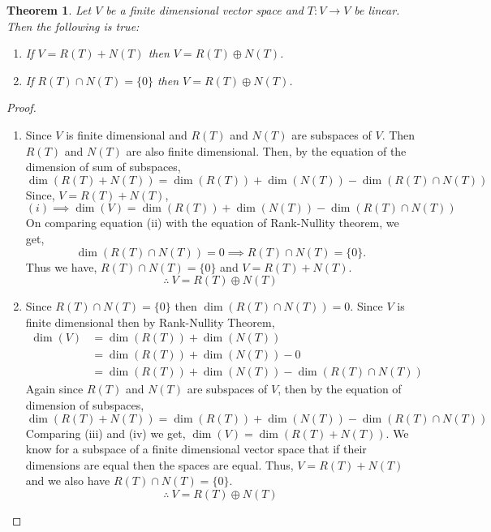 \documentclass[12pt, a4paper]{article}
\newtheorem{theorem}{Theorem}[section]
\theoremstyle{definition}
\theoremstyle{remark}
\begin{document}
\begin{theorem}
    Let $V$ be a finite dimensional vector space and $T:V \to V$ be linear. Then the following is true:
    \begin{enumerate}
        \item If $V = R(T) + N(T)$ then $V = R(T)\oplus N(T)$.
        \item If $R(T) \cap N(T) = \{0\}$ then $V = R(T)\oplus N(T)$.
    \end{enumerate}
\end{theorem}

\begin{proof}
    \begin{enumerate}
        \item Since $V$ is finite dimensional and $R(T)$ and $N(T)$ are subspaces of $V$. Then $R(T)$ and $N(T)$ are also finite dimensional. Then, by the equation of the dimension of sum of subspaces,
        \[
        \dim(R(T) + N(T))=\dim(R(T))+\dim(N(T))-\dim(R(T) \cap N(T)) \tag{i}
        \]
        Since, $V = R(T) + N(T)$,
        \[
        (i) \implies \dim(V)=\dim(R(T))+\dim(N(T))-\dim(R(T) \cap N(T)) \tag{ii}
        \]
        On comparing equation (ii) with the equation of Rank-Nullity theorem, we get,
        \[
        \dim(R(T) \cap N(T)) = 0 \implies R(T) \cap N(T) = \{0\}.
        \]
        Thus we have, $R(T) \cap N(T) = \{0\}$ and $V = R(T) + N(T)$.
        \[
        \therefore \ V = R(T)\oplus N(T)
        \]

        \item Since $R(T) \cap N(T) = \{0\}$ then $\dim(R(T) \cap N(T)) = 0$. Since $V$ is finite dimensional then by Rank-Nullity Theorem,
        \begin{align*}
            \dim(V) &= \dim(R(T))+\dim(N(T)) \\
            &= \dim(R(T))+\dim(N(T)) - 0 \\
            &= \dim(R(T))+\dim(N(T)) - \dim(R(T) \cap N(T)) \tag{iii}
        \end{align*}
        Again since $R(T)$ and $N(T)$ are subspaces of $V$, then by the equation of dimension of subspaces,
        \begin{equation*}
            \dim(R(T) + N(T))=\dim(R(T))+\dim(N(T))-\dim(R(T) \cap N(T)) \tag{iv}
        \end{equation*}
        Comparing (iii) and (iv) we get, $\dim(V)=\dim(R(T) + N(T))$. We know for a subspace of a finite dimensional vector space that if their dimensions are equal then the spaces are equal. Thus, $V = R(T)+N(T)$ and we also have $R(T) \cap N(T) = \{0\}$.
        \[
        \therefore \ V = R(T) \oplus N(T)
        \]
    \end{enumerate}
\end{proof}
\end{document}
